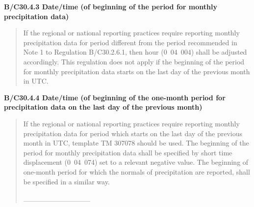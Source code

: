 \textbf{B/C30.4.3 Date/time (of beginning of the period for monthly precipitation data)}

\begin{quote}
If the regional or national reporting practices require reporting monthly precipitation data for period different from the period recommended in Note 1 to Regulation B/C30.2.6.1, then hour (0~04~004) shall be adjusted accordingly. This regulation does not apply if the beginning of the period for monthly precipitation data starts on the last day of the previous month in UTC.
\end{quote}

\textbf{B/C30.4.4 Date/time (of beginning of the one-month period for precipitation data on the last day of the previous month)}

\begin{quote}
If the regional or national reporting practices require reporting monthly precipitation data for period which starts on the last day of the previous month in UTC, template TM 307078 should be used. The beginning of the period for monthly precipitation data shall be specified by short time displacement (0~04~074) set to a relevant negative value. The beginning of one-month period for which the normals of precipitation are reported, shall be specified in a similar way.

\_\_\_\_\_\_\_\_\_\_\_\_\_
\end{quote}
